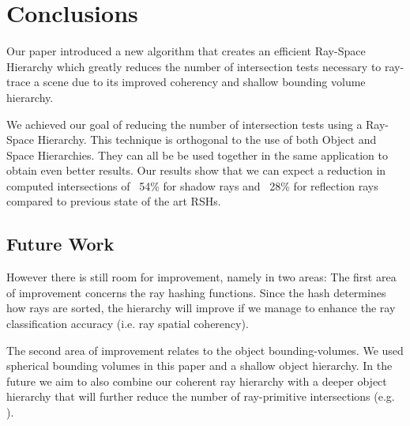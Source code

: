 
\chapter{Conclusions}
\label{chapter:conclusions}

Our paper introduced a new algorithm that creates an efficient Ray-Space Hierarchy which greatly reduces the number of intersection tests necessary to ray-trace a scene due to its improved coherency and shallow bounding volume hierarchy.

We achieved our goal of reducing the number of intersection tests using a Ray-Space Hierarchy. This technique is orthogonal to the use of both Object and Space Hierarchies. They can all be be used together in the same application to obtain even better results.
Our results show that we can expect a reduction in computed intersections of ~54\% for shadow rays and ~28\% for reflection rays compared to previous state of the art RSHs.

\section{Future Work}
\label{section:future-work}

However there is still room for improvement, namely in two areas: The first area of improvement concerns the ray hashing functions. Since the hash determines how rays are sorted, the hierarchy will improve if we manage to enhance the ray classification accuracy (i.e. ray spatial coherency).

The second area of improvement relates to the object bounding-volumes. We used spherical bounding volumes in this paper and a shallow object hierarchy. In the future we aim to also combine our coherent ray hierarchy with a deeper object hierarchy that will further reduce the number of ray-primitive intersections (e.g. \cite{Bradshaw04}).